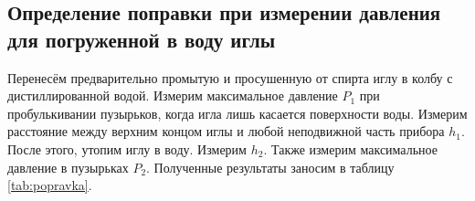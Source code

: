 \documentclass[a4paper, 12pt]{article}
\begin{document}
    \subsection*{Определение поправки при измерении давления для погруженной в воду иглы}

    \noindent Перенесём предварительно промытую и просушенную от спирта иглу в колбу с дистиллированной водой. Измерим максимальное давление $P_1$ при пробулькивании пузырьков, когда игла лишь касается поверхности воды. Измерим расстояние между верхним концом иглы и любой неподвижной часть прибора $h_1$. \\

    \noindent После этого, утопим иглу в воду. Измерим $h_2$. Также измерим максимальное давление в пузырьках $P_2$. Полученные результаты заносим в таблицу \ref{tab:popravka}.
\end{document}
